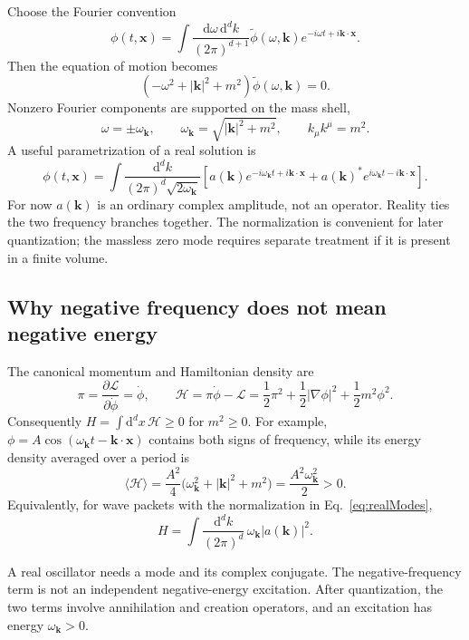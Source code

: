 \documentclass[11pt]{article}
\newcommand{\dd}{\mathrm{d}}
\newcommand{\Lag}{\mathcal{L}}
\begin{document}
Choose the Fourier convention
\begin{equation}
\phi(t,\bm x)=\int\frac{\dd\omega\,\dd^d k}{(2\pi)^{d+1}}
\widetilde\phi(\omega,\bm k)e^{-i\omega t+i\bm k\cdot\bm x}.
\end{equation}
Then the equation of motion becomes
\begin{equation}
(-\omega^2+|\bm k|^2+m^2)\widetilde\phi(\omega,\bm k)=0.
\end{equation}
Nonzero Fourier components are supported on the mass shell,
\begin{equation}
\omega=\pm\omega_{\bm k},\qquad
\omega_{\bm k}=\sqrt{|\bm k|^2+m^2},\qquad k_\mu k^\mu=m^2.
\label{eq:KGdispersion}
\end{equation}
A useful parametrization of a real solution is
\begin{equation}
\phi(t,\bm x)=\int\frac{\dd^d k}{(2\pi)^d\sqrt{2\omega_{\bm k}}}
\left[a(\bm k)e^{-i\omega_{\bm k}t+i\bm k\cdot\bm x}
+a(\bm k)^*e^{i\omega_{\bm k}t-i\bm k\cdot\bm x}\right].
\label{eq:realModes}
\end{equation}
For now \(a(\bm k)\) is an ordinary complex amplitude, not an operator.
Reality ties the two frequency branches together. The normalization is
convenient for later quantization; the massless zero mode requires separate
treatment if it is present in a finite volume.

\subsection{Why negative frequency does not mean negative energy}

The canonical momentum and Hamiltonian density are
\begin{equation}
\pi=\frac{\partial\Lag}{\partial\dot\phi}=\dot\phi,
\qquad
\mathcal H=\pi\dot\phi-\Lag
=\frac12\pi^2+\frac12|\nabla\phi|^2+\frac12m^2\phi^2.
\label{eq:scalarH}
\end{equation}
Consequently \(H=\int\dd^d x\,\mathcal H\geq0\) for \(m^2\geq0\).
For example, \(\phi=A\cos(\omega_{\bm k}t-\bm k\cdot\bm x)\)
contains both signs of frequency, while its energy density averaged over a
period is
\begin{equation}
\langle\mathcal H\rangle
=\frac{A^2}{4}\bigl(\omega_{\bm k}^2+|\bm k|^2+m^2\bigr)
=\frac{A^2\omega_{\bm k}^2}{2}>0.
\end{equation}
Equivalently, for wave packets with the normalization in
Eq.~\eqref{eq:realModes},
\begin{equation}
H=\int\frac{\dd^d k}{(2\pi)^d}\,
\omega_{\bm k}|a(\bm k)|^2.
\end{equation}
\begin{keyidea}
A real oscillator needs a mode and its complex conjugate. The
negative-frequency term is not an independent negative-energy excitation.
After quantization, the two terms involve annihilation and creation
operators, and an excitation has energy \(\omega_{\bm k}>0\).
\end{keyidea}
\end{document}
